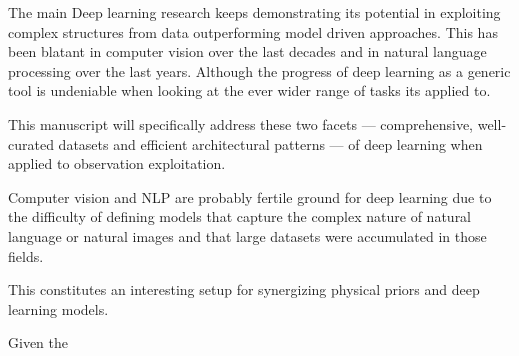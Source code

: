 \begin{bibunit}
The main 
Deep learning research keeps demonstrating its potential in exploiting complex structures from data outperforming model driven approaches.
This has been blatant in computer vision over the last decades and in natural language processing over the last years.
Although the progress of deep learning as a generic tool is undeniable when looking at the ever wider range of tasks its applied to.

This manuscript will specifically address these two facets — comprehensive, well-curated datasets and efficient architectural patterns — of deep learning when applied to observation exploitation.

Computer vision and NLP are probably fertile ground for deep learning due to the difficulty of defining models that capture the complex nature of natural language or natural images and that large datasets were accumulated in those fields. 



This constitutes an interesting setup for synergizing physical priors and deep learning models.

Given the 





\end{bibunit}
